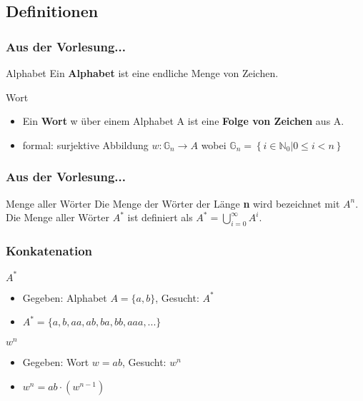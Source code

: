 \subsection{Definitionen}
\begin{frame}
	\frametitle{Aus der Vorlesung...}
	\begin{block}{Alphabet}
	Ein \textbf{Alphabet} ist eine endliche Menge von Zeichen.
	\end{block}

	\pause
	\begin{block}{Wort}
		\begin{itemize}
			\item Ein \textbf{Wort} w über einem Alphabet A ist eine \textbf{Folge von Zeichen} aus A.	\pause
			\item formal: surjektive Abbildung $w : \mathbb G_n \rightarrow A$ wobei $\mathbb G_n = \left\{i \in \mathbb N_0 | 0 \leq i < n\right\}$

		\end{itemize}
	\end{block}
\end{frame}

\begin{frame}
	\frametitle{Aus der Vorlesung...}
	\begin{block}{Menge aller Wörter}
	Die Menge der Wörter der Länge \textbf{n} wird bezeichnet mit $A^n$. Die Menge aller Wörter $A^*$ ist definiert als $A^* = \bigcup^{\infty}_{i=0} A^i$.
	\end{block}

\end{frame}

\begin{frame}
	\frametitle{Konkatenation}
	\begin{block}{$A^*$}
		\begin{itemize}
			\item Gegeben: Alphabet $A = \{a, b\}$, Gesucht: $A^*$
			\item $A^* = \{a, b, aa, ab, ba, bb, aaa, ...\}$
		\end{itemize}
	\end{block}

	\begin{block}{$w^n$}
		\begin{itemize}
			\item Gegeben: Wort $w = ab$, Gesucht: $w^n$ \pause
			\item $w^n = ab \cdot (w^{n-1})$
		\end{itemize}
	\end{block}
\end{frame}

